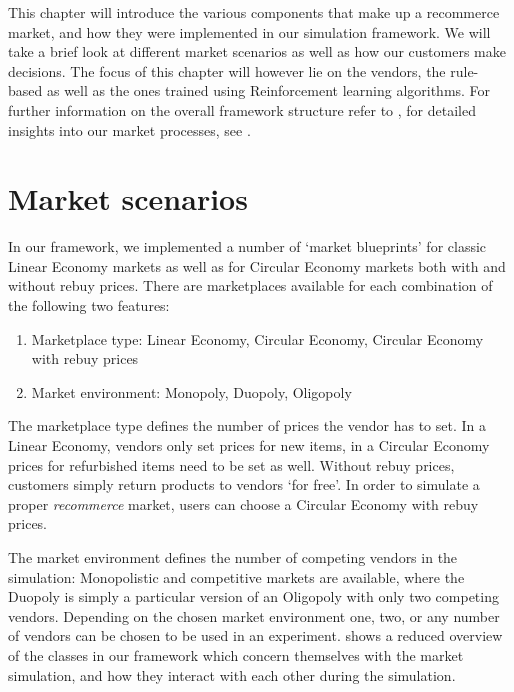 \begin{jointwork}\label{ch:SimulatingMarketplace}
	This chapter will introduce the various components that make up a recommerce market, and how they were implemented in our simulation framework. We will take a brief look at different market scenarios as well as how our customers make decisions. The focus of this chapter will however lie on the vendors, the rule-based as well as the ones trained using Reinforcement learning algorithms. For further information on the overall framework structure refer to \cite{LeoThesis}, for detailed insights into our market processes, see \cite{NickThesis}.
\end{jointwork}

\section{Market scenarios}\label{sec:MarketScenarios}

In our framework, we implemented a number of `market blueprints' for classic Linear Economy markets as well as for Circular Economy markets both with and without rebuy prices. There are marketplaces available for each combination of the following two features:
\begin{enumerate}
	\item Marketplace type: Linear Economy, Circular Economy, Circular Economy with rebuy prices
	\item Market environment: Monopoly, Duopoly, Oligopoly
\end{enumerate}
The marketplace type defines the number of prices the vendor has to set. In a Linear Economy, vendors only set prices for new items, in a Circular Economy prices for refurbished items need to be set as well. Without rebuy prices, customers simply return products to vendors `for free'. In order to simulate a proper \emph{recommerce} market, users can choose a Circular Economy with rebuy prices.

The market environment defines the number of competing vendors in the simulation: Monopolistic and competitive markets are available, where the Duopoly is simply a particular version of an Oligopoly with only two competing vendors. Depending on the chosen market environment one, two, or any number of vendors can be chosen to be used in an experiment.  shows a reduced overview of the classes in our framework which concern themselves with the market simulation, and how they interact with each other during the simulation.


